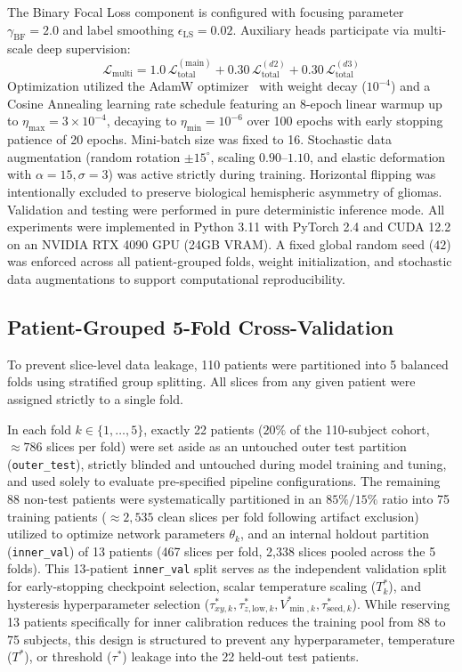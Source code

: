 \documentclass[preprint,12pt,authoryear]{elsarticle}
\begin{document}
The Binary Focal Loss component is configured with focusing parameter $\gamma_{\text{BF}} = 2.0$ and label smoothing $\epsilon_{\text{LS}} = 0.02$. Auxiliary heads participate via multi-scale deep supervision:
\begin{equation}
\mathcal{L}_{\text{multi}} = 1.0\,\mathcal{L}_{\text{total}}^{(\text{main})} + 0.30\,\mathcal{L}_{\text{total}}^{(d2)} + 0.30\,\mathcal{L}_{\text{total}}^{(d3)}
\end{equation}
Optimization utilized the AdamW optimizer~\citep{loshchilov2019decoupled} with weight decay ($10^{-4}$) and a Cosine Annealing learning rate schedule featuring an 8-epoch linear warmup up to $\eta_{\max} = 3 \times 10^{-4}$, decaying to $\eta_{\min} = 10^{-6}$ over 100 epochs with early stopping patience of 20 epochs. Mini-batch size was fixed to 16. Stochastic data augmentation (random rotation $\pm 15^\circ$, scaling $0.90$--$1.10$, and elastic deformation with $\alpha=15, \sigma=3$) was active strictly during training. Horizontal flipping was intentionally excluded to preserve biological hemispheric asymmetry of gliomas. Validation and testing were performed in pure deterministic inference mode. All experiments were implemented in Python 3.11 with PyTorch 2.4 and CUDA 12.2 on an NVIDIA RTX 4090 GPU (24GB VRAM). A fixed global random seed ($42$) was enforced across all patient-grouped folds, weight initialization, and stochastic data augmentations to support computational reproducibility.

\subsection{Patient-Grouped 5-Fold Cross-Validation}
To prevent slice-level data leakage, 110 patients were partitioned into 5 balanced folds using stratified group splitting. All slices from any given patient were assigned strictly to a single fold.

In each fold $k \in \{1, \dots, 5\}$, exactly 22 patients ($20\%$ of the 110-subject cohort, $\approx 786$ slices per fold) were set aside as an untouched outer test partition (\texttt{outer\_test}), strictly blinded and untouched during model training and tuning, and used solely to evaluate pre-specified pipeline configurations. The remaining 88 non-test patients were systematically partitioned in an $85\% / 15\%$ ratio into 75 training patients ($\approx 2,535$ clean slices per fold following artifact exclusion) utilized to optimize network parameters $\theta_k$, and an internal holdout partition (\texttt{inner\_val}) of 13 patients (467 slices per fold, 2,338 slices pooled across the 5 folds). This 13-patient \texttt{inner\_val} split serves as the independent validation split for early-stopping checkpoint selection, scalar temperature scaling ($T_k^*$), and hysteresis hyperparameter selection ($\tau_{xy,k}^*, \tau_{z,\mathrm{low},k}^*, V_{\min,k}^*, \tau_{\mathrm{seed},k}^*$). While reserving 13 patients specifically for inner calibration reduces the training pool from 88 to 75 subjects, this design is structured to prevent any hyperparameter, temperature ($T^*$), or threshold ($\tau^*$) leakage into the 22 held-out test patients.
\end{document}
